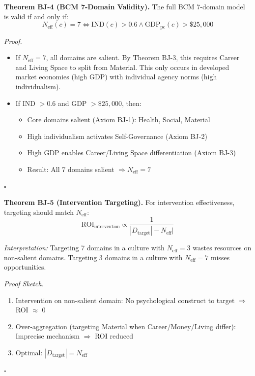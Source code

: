 \begin{tcolorbox}[colback=green!5!white, colframe=green!75!black, title=Theorem BJ-4: BCM Validity Conditions]
\textbf{Theorem BJ-4 (BCM 7-Domain Validity).}
The full BCM 7-domain model is valid if and only if:
\begin{equation}
N_{\text{eff}}(c) = 7 \iff \text{IND}(c) > 0.6 \land \text{GDP}_{\text{pc}}(c) > \$25,000
\end{equation}

\textit{Proof.}
\begin{itemize}[nosep]
\item[$(\Rightarrow)$] If $N_{\text{eff}} = 7$, all domains are salient. By Theorem BJ-3, this requires
                       Career and Living Space to split from Material. This only occurs in developed
                       market economies (high GDP) with individual agency norms (high individualism).
\item[$(\Leftarrow)$] If IND $> 0.6$ and GDP $> \$25,000$, then:
  \begin{itemize}[nosep]
    \item Core domains salient (Axiom BJ-1): Health, Social, Material
    \item High individualism activates Self-Governance (Axiom BJ-2)
    \item High GDP enables Career/Living Space differentiation (Axiom BJ-3)
    \item Result: All 7 domains salient $\Rightarrow N_{\text{eff}} = 7$
  \end{itemize}
\end{itemize}
\hfill $\square$
\end{tcolorbox}

\begin{tcolorbox}[colback=green!5!white, colframe=green!75!black, title=Theorem BJ-5: Intervention Targeting Optimality]
\textbf{Theorem BJ-5 (Intervention Targeting).}
For intervention effectiveness, targeting should match $N_{\text{eff}}$:
\begin{equation}
\text{ROI}_{\text{intervention}} \propto \frac{1}{|D_{\text{target}}| - N_{\text{eff}}|}
\end{equation}

\textit{Interpretation:} Targeting 7 domains in a culture with $N_{\text{eff}} = 3$ wastes resources
on non-salient domains. Targeting 3 domains in a culture with $N_{\text{eff}} = 7$ misses opportunities.

\textit{Proof Sketch.}
\begin{enumerate}[nosep]
\item Intervention on non-salient domain: No psychological construct to target $\Rightarrow$ ROI $\approx$ 0
\item Over-aggregation (targeting Material when Career/Money/Living differ): Imprecise mechanism $\Rightarrow$ ROI reduced
\item Optimal: $|D_{\text{target}}| = N_{\text{eff}}$
\end{enumerate}
\hfill $\square$
\end{tcolorbox}

